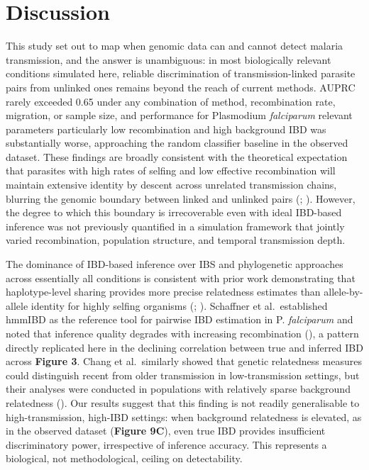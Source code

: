 \documentclass[
  11pt,
]{article}
\begin{document}
\newpage

\section{Discussion}\label{discussion}

This study set out to map when genomic data can and cannot detect
malaria transmission, and the answer is unambiguous: in most
biologically relevant conditions simulated here, reliable discrimination
of transmission-linked parasite pairs from unlinked ones remains beyond
the reach of current methods. AUPRC rarely exceeded 0.65 under any
combination of method, recombination rate, migration, or sample size,
and performance for Plasmodium \emph{falciparum} relevant parameters
particularly low recombination and high background IBD was substantially
worse, approaching the random classifier baseline in the observed
dataset. These findings are broadly consistent with the theoretical
expectation that parasites with high rates of selfing and low effective
recombination will maintain extensive identity by descent across
unrelated transmission chains, blurring the genomic boundary between
linked and unlinked pairs (; ). However, the degree to which this boundary is irrecoverable even
with ideal IBD-based inference was not previously quantified in a
simulation framework that jointly varied recombination, population
structure, and temporal transmission depth.

The dominance of IBD-based inference over IBS and phylogenetic
approaches across essentially all conditions is consistent with prior
work demonstrating that haplotype-level sharing provides more precise
relatedness estimates than allele-by-allele identity for highly selfing
organisms (;
). Schaffner et
al.~established hmmIBD as the reference tool for pairwise IBD estimation
in P. \emph{falciparum} and noted that inference quality degrades with
increasing recombination (), a pattern directly replicated here in the declining correlation
between true and inferred IBD across \textbf{Figure 3}. Chang et
al.~similarly showed that genetic relatedness measures could distinguish
recent from older transmission in low-transmission settings, but their
analyses were conducted in populations with relatively sparse background
relatedness (). Our results
suggest that this finding is not readily generalisable to
high-transmission, high-IBD settings: when background relatedness is
elevated, as in the observed dataset (\textbf{Figure 9C}), even true IBD
provides insufficient discriminatory power, irrespective of inference
accuracy. This represents a biological, not methodological, ceiling on
detectability.
\end{document}
